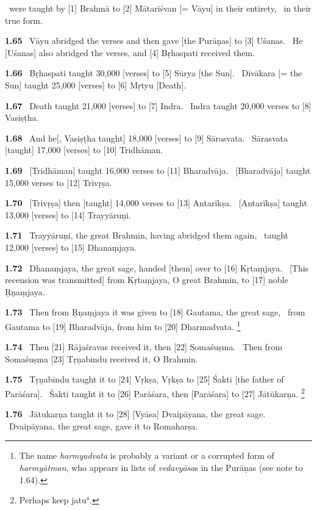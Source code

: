 \documentclass{article}
\newcommand{\skt}[1]{\textit{#1}}
\begin{document}
\ were taught by [1] Brahmā to [2] Mātariśvan [= Vāyu] in their entirety,%
\              in their true form.%


\textbf{1.65}%
\ Vāyu abridged the verses and then gave [the Purāṇas] to [3] Uśanas.%
\ He [Uśanas] also abridged the verses, and [4] Bṛhaspati received them.%


\textbf{1.66}%
\ Bṛhaspati taught 30,000 [verses] to [5] Sūrya [the Sun].%
\ Divākara [= the Sun] taught 25,000 [verses] to [6] Mṛtyu [Death].%


\textbf{1.67}%
\ Death taught 21,000 [verses] to [7] Indra.%
\ Indra taught 20,000 verses to [8] Vasiṣṭha.%


\textbf{1.68}%
\ And he[, Vasiṣṭha taught] 18,000 [verses] to [9] Sārasvata.%
\ Sārasvata [taught] 17,000 [verses] to [10] Tridhāman.%


\textbf{1.69}%
\ [Tridhāman] taught 16,000 verses to [11] Bharadvāja.%
\ [Bharadvāja] taught 15,000 verses to [12] Trivṛṣa.%


\textbf{1.70}%
\ [Trivṛṣa] then [taught] 14,000 verses to [13] Antarīkṣa.%
\ [Antarīkṣa] taught 13,000 [verses] to [14] Trayyāruṇi.%


\textbf{1.71}%
\ Trayyāruṇi, the great Brahmin, having abridged them again,%
\ taught 12,000 [verses] to [15] Dhanaṃjaya.%


\textbf{1.72}%
\ Dhanaṃjaya, the great sage, handed [them] over to [16] Kṛtaṃjaya.%
\ [This recension  was transmitted] from Kṛtaṃjaya, O great Brahmin, to [17] noble Ṛṇaṃjaya.%


\textbf{1.73}%
\ Then from Ṛṇaṃjaya it was given to [18] Gautama, the great sage,%
\ from Gautama to [19] Bharadvāja, from him to [20] Dharmadvata.%
\footnote{The name \skt{harmyadvata} is probably a variant or a corrupted form                        of \skt{harmyātman}, who appears in lists of \skt{vedavyāsa}s                        in the Purāṇas (see note to 1.64). }%


\textbf{1.74}%
\ Then [21] Rājaśravas received it, then [22] Somaśuṣma.%
\ Then from Somaśuṣma [23] Tṛṇabindu received it, O Brahmin.%


\textbf{1.75}%
\ Tṛṇabindu taught it to [24] Vṛkṣa, Vṛkṣa to [25] Śakti [the father of Parāśara].%
\ Śakti taught it to [26] Parāśara, then [Parāśara] to [27] Jātūkarṇa.%
\footnote{Perhaps keep jatu°. }%


\textbf{1.76}%
\ Jātukarṇa taught it to [28] [Vyāsa] Dvaipāyana, the great sage.%
\ Dvaipāyana, the great sage, gave it to Romaharṣa.%
\end{document}

